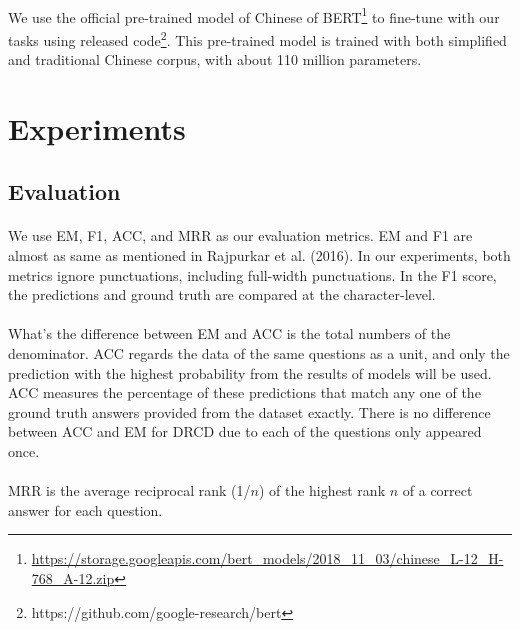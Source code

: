 \documentclass{article}
\begin{document}
\paragraph{}
We use the official pre-trained model of Chinese of BERT\footnote{\url{https://storage.googleapis.com/bert_models/2018_11_03/chinese_L-12_H-768_A-12.zip}} to fine-tune with our tasks using released code\footnote{\label{run_squad}https://github.com/google-research/bert}. This pre-trained model is trained with both simplified and traditional Chinese corpus, with about 110 million parameters.

\section{Experiments}
\paragraph{}

\subsection{Evaluation}
\paragraph{}
We use EM, F1, ACC, and MRR as our evaluation metrics. EM and F1 are almost as same as mentioned in Rajpurkar et al. (2016)\cite{rajpurkar2016squad}. In our experiments, both metrics ignore punctuations, including full-width punctuations. In the F1 score, the predictions and ground truth are compared at the character-level.

\paragraph{}
What's the difference between EM and ACC is the total numbers of the denominator. ACC regards the data of the same questions as a unit, and only the prediction with the highest probability from the results of models will be used. ACC measures the percentage of these predictions that match any one of the ground truth answers provided from the dataset exactly. There is no difference between ACC and EM for DRCD due to each of the questions only appeared once.

\paragraph{}
MRR is the average reciprocal rank (1/$n$) of the highest rank $n$ of a correct answer for each question.
\end{document}
